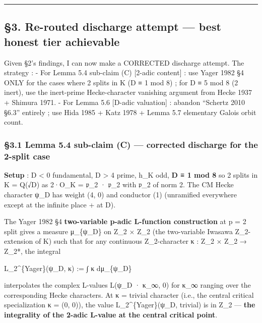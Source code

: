 \documentclass[
  11pt,
  a4paper,
]{article}
\begin{document}
\begin{center}\rule{0.5\linewidth}{0.5pt}\end{center}

\hypertarget{re-routed-discharge-attempt-best-honest-tier-achievable}{%
\subsection{§3. Re-routed discharge attempt --- best honest tier achievable}\label{re-routed-discharge-attempt-best-honest-tier-achievable}}

Given §2's findings, I can now make a CORRECTED discharge attempt. The strategy :
- For Lemma 5.4 sub-claim (C) {[}2-adic content{]} : use Yager 1982 §4 ONLY for the cases where 2 splits in K (D ≡ 1 mod 8) ; for D ≡ 5 mod 8 (2 inert), use the inert-prime Hecke-character vanishing argument from Hecke 1937 + Shimura 1971.
- For Lemma 5.6 {[}\textbar D\textbar-adic valuation{]} : abandon ``Schertz 2010 §6.3'' entirely ; use Hida 1985 + Katz 1978 + Lemma 5.7 elementary Galois orbit count.

\hypertarget{lemma-5.4-sub-claim-c-corrected-discharge-for-the-2-split-case}{%
\subsubsection{§3.1 Lemma 5.4 sub-claim (C) --- corrected discharge for the 2-split case}\label{lemma-5.4-sub-claim-c-corrected-discharge-for-the-2-split-case}}

\textbf{Setup} : D \textless{} 0 fundamental, \textbar D\textbar{} \textgreater{} 4 prime, h\_K odd, \textbf{D ≡ 1 mod 8} so 2 splits in K = Q(√D) as 2·O\_K = 𝔭\_2 · 𝔭\_2 with 𝔭\_2 of norm 2. The CM Hecke character ψ\_D has weight (4, 0) and conductor (1) (unramified everywhere except at the infinite place + at \textbar D\textbar).

The Yager 1982 §4 \textbf{two-variable p-adic L-function construction} at p = 2 split gives a measure μ\_\{ψ\_D\} on Z\_2 × Z\_2 (the two-variable Iwasawa Z\_2-extension of K) such that for any continuous Z\_2-character κ : Z\_2 × Z\_2 → Z\_2*, the integral

L\_2\^{}\{Yager\}(ψ\_D, κ) := ∫ κ dμ\_\{ψ\_D\}

interpolates the complex L-values L(ψ\_D · κ\_∞, 0) for κ\_∞ ranging over the corresponding Hecke characters. At κ = trivial character (i.e., the central critical specialization κ = (0, 0)), the value L\_2\^{}\{Yager\}(ψ\_D, trivial) is in Z\_2 --- \textbf{the integrality of the 2-adic L-value at the central critical point}.
\end{document}
